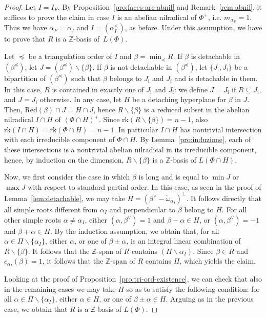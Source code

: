 \documentclass[10pt]{amsart}
\theoremstyle{definition}
\theoremstyle{remark}
\newcommand\smeno{\smallsetminus}
\newcommand\ganz{\mathbb Z}
\newcommand\rk{\mathrm{rk}}
\newcommand\al{\alpha}
\newcommand\be{\beta}
\newcommand\red{\mathrm{Red}}
\newcommand\preq{\preccurlyeq}
\renewcommand{\leq}{\leqslant}
\begin{document}
\begin{proof}
Let $I=I_F$. 
By Proposition~\ref{pro:faces-are-abnil} and Remark~\ref{rem:abnil}, it suffices to prove the claim in case $I$ is an abelian nilradical of $\Phi^+$, i.e. $m_{\al_F}=1$. 
Thus we have  $\al_F=\al_I$ and $I=(\al_I^\leq)$, as before. 
Under this assumption, we have to prove that $R$ is a $\ganz$-basis of~$L(\Phi)$. 


\par
Let $\preq$ be a triangulation order of $I$ and $\be=\min_\preq R$. 
If $\be$ is detachable in  $(\be^\preq)$, let $J=(\be^\preq)\smeno\{\be\}$.
If $\be$ is not detachable in  $(\be^\preq)$, let $\{J_\mathrm i, J_\mathrm f\}$ be a bipartition of $(\be^\preq)$ such that $\be$ belongs to $J_\mathrm i$ and $J_\mathrm f$ and is detachable in  them.
In this case, $R$ is contained in exactly one of $J_\mathrm i$ and $J_\mathrm f$: we define $J=J_\mathrm i$ if $R\subseteq J_\mathrm i$, and $J=J_\mathrm f$ otherwise. 
In any case, let $H$ be a detaching hyperplane for $\be$ in $J$.
Then, $\red(\be)\cap J=H\cap J$, hence $R\smeno\{\be\}$ is a reduced subset in the abelian nilradical $I\cap H$ of $(\Phi\cap H)^+$. 
Since $\rk(R\smeno\{\be\})=n-1$, also $\rk(I\cap H)=\rk(\Phi\cap H)=n-1$.
In particular $I\cap H$ has nontrivial intersection with each irreducible component of  $\Phi\cap H$. 
By Lemma~\ref{pro:induzione}, each of these intersections  is a nontrivial  abelian nilradical in its irreducible component, hence, by induction on the dimension, $R\smeno\{\be\}$ is a $\ganz$-basis of $L(\Phi\cap H)$.

\par
Now, we first consider the case in which $\be$ is long and is equal to $\min J$ or $\max J$ with respect to standard partial order.
In this case, as seen in the proof of Lemma~\ref{lem:detachable}, we may take $H=(\be^\vee-\check\omega_{\al_I})^\perp$.
It follows directly that all simple roots different from $\al_I$ and perpendicular to $\be$ belong to $H$. 
For all other simple roots $\al\neq\al_I$, either $(\al, \be^\vee)=1$ and $\be-\al\in H$, or $(\al, \be^\vee)=-1$ and $\be+\al\in H$. 
By the induction assumption, we obtain that, for all $\al\in \Pi\smeno\{\al_I\}$, either $\al$, or one of $\be\pm \al$, is an integral linear combination of $R\smeno\{\be\}$. 
It follows that  the $\ganz$-span of $R$ contains $(\Pi\smeno\al_I)$. 
Since $\be\in R$ and $c_{\al_I}(\be)=1$, it follows that the $\ganz$-span of $R$ contains $\Pi$, which yields the claim.

\par
Looking at the proof of Proposition~\ref{pro:tri-ord-existence}, we can check that also in the remaining cases we may take $H$ so as to satisfy the following condition: for all $\al\in \Pi\smeno \{\al_I\}$, either $\al\in H$, or one of $\be\pm \al\in H$.
Arguing as in the previous case, we obtain that $R$ is a $\ganz$-basis of $L(\Phi)$.
\end{proof}
\end{document}

